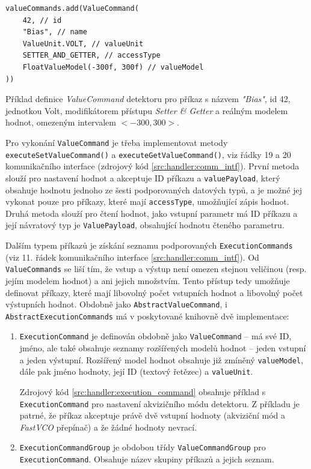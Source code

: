 \begin{code}[h!]
\begin{verbatim}
valueCommands.add(ValueCommand(
    42, // id
    "Bias", // name
    ValueUnit.VOLT, // valueUnit
    SETTER_AND_GETTER, // accessType
    FloatValueModel(-300f, 300f) // valueModel
))
\end{verbatim}
\caption{Příklad definice \textit{ValueCommand} detektoru pro příkaz s názvem \textit{"Bias"}, id 42, jednotkou Volt, modifikátorem přístupu \textit{Setter \& Getter} a reálným modelem hodnot, omezeným intervalem $<-300,300>$.}
\label{src:handler:value_command}
\end{code}

Pro vykonání \texttt{ValueCommand} je třeba implementovat metody \texttt{executeSetValueCommand()} a \texttt{executeGetValueCommand()}, viz řádky 19 a 20 komunikačního interface (zdrojový kód \ref{src:handler:comm_intf}). První metoda slouží pro nastavení hodnot a akceptuje ID příkazu a \texttt{valuePayload}, který obsahuje hodnotu jednoho ze šesti podporovaných datových typů, a je možné jej vykonat pouze pro příkazy, které mají \texttt{accessType}, umožňující zápis hodnot. Druhá metoda slouží pro čtení hodnot, jako vstupní parametr má ID příkazu a její návratový typ je \texttt{ValuePayload}, obsahující hodnotu čteného parametru.

Dalším typem příkazů je získání seznamu podporovaných \texttt{ExecutionCommands} (viz 11. řádek komunikačního interface \ref{src:handler:comm_intf}). Od \texttt{ValueCommands} se liší tím, že vstup a výstup není omezen stejnou veličinou (resp. jejím modelem hodnot) a ani jejich množstvím. Tento přístup tedy umožňuje definovat příkazy, které mají libovolný počet vstupních hodnot a libovolný počet výstupních hodnot. Obdobně jako \texttt{AbstractValueCommand}, i \texttt{AbstractExecutionCommands} má v poskytované knihovně dvě implementace:
\begin{enumerate}[label=(\roman*)]
	\item \texttt{ExecutionCommand} je definován obdobně jako \texttt{ValueCommand} -- má své ID, jméno, ale také obsahuje seznamy rozšířených modelů hodnot -- jeden vstupní a jeden výstupní. Rozšířený model hodnot obsahuje již zmíněný \texttt{valueModel}, dále pak jméno hodnoty, její ID (textový řetězec) a \texttt{valueUnit}.
	
	Zdrojový kód \ref{src:handler:execution_command} obsahuje příklad s \texttt{ExecutionCommand} pro nastavení akvizičního módu detektoru. Z příkladu je patrné, že příkaz akceptuje právě dvě vstupní hodnoty (akviziční mód a \textit{FastVCO} přepínač) a že žádné hodnoty nevrací.
	
	\item \texttt{ExecutionCommandGroup} je obdobou třídy \texttt{ValueCommandGroup} pro \texttt{ExecutionCommand}. Obsahuje název skupiny příkazů a jejich seznam.
\end{enumerate}

